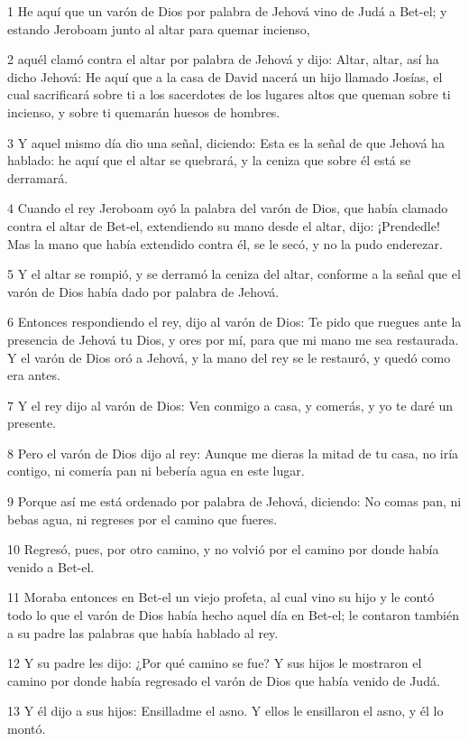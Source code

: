\par 1 He aquí que un varón de Dios por palabra de Jehová vino de Judá a Bet-el; y estando Jeroboam junto al altar para quemar incienso,
\par 2 aquél clamó contra el altar por palabra de Jehová y dijo: Altar, altar, así ha dicho Jehová: He aquí que a la casa de David nacerá un hijo llamado Josías, el cual sacrificará sobre ti a los sacerdotes de los lugares altos que queman sobre ti incienso, y sobre ti quemarán huesos de hombres. 
\par 3 Y aquel mismo día dio una señal, diciendo: Esta es la señal de que Jehová ha hablado: he aquí que el altar se quebrará, y la ceniza que sobre él está se derramará.
\par 4 Cuando el rey Jeroboam oyó la palabra del varón de Dios, que había clamado contra el altar de Bet-el, extendiendo su mano desde el altar, dijo: ¡Prendedle! Mas la mano que había extendido contra él, se le secó, y no la pudo enderezar.
\par 5 Y el altar se rompió, y se derramó la ceniza del altar, conforme a la señal que el varón de Dios había dado por palabra de Jehová.
\par 6 Entonces respondiendo el rey, dijo al varón de Dios: Te pido que ruegues ante la presencia de Jehová tu Dios, y ores por mí, para que mi mano me sea restaurada. Y el varón de Dios oró a Jehová, y la mano del rey se le restauró, y quedó como era antes.
\par 7 Y el rey dijo al varón de Dios: Ven conmigo a casa, y comerás, y yo te daré un presente.
\par 8 Pero el varón de Dios dijo al rey: Aunque me dieras la mitad de tu casa, no iría contigo, ni comería pan ni bebería agua en este lugar.
\par 9 Porque así me está ordenado por palabra de Jehová, diciendo: No comas pan, ni bebas agua, ni regreses por el camino que fueres.
\par 10 Regresó, pues, por otro camino, y no volvió por el camino por donde había venido a Bet-el.
\par 11 Moraba entonces en Bet-el un viejo profeta, al cual vino su hijo y le contó todo lo que el varón de Dios había hecho aquel día en Bet-el; le contaron también a su padre las palabras que había hablado al rey.
\par 12 Y su padre les dijo: ¿Por qué camino se fue? Y sus hijos le mostraron el camino por donde había regresado el varón de Dios que había venido de Judá.
\par 13 Y él dijo a sus hijos: Ensilladme el asno. Y ellos le ensillaron el asno, y él lo montó.
